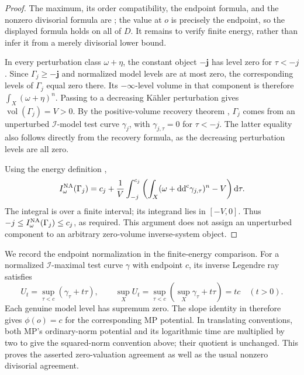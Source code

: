 \begin{proof}
The maximum, its order compatibility, the endpoint formula, and the
nonzero divisorial formula are
\cite[Definition~4.7 and Corollary~4.8]{Xia23}; the value at \(o\)
is precisely the endpoint, so the displayed formula holds on all of \(D\).
It remains to verify finite energy, rather than infer it from a merely
divisorial lower bound.

In every perturbation class \(\omega+\eta\), the constant object
\(\mathbf{-j}\) has level zero for \(\tau<-j\).
Since \(\Gamma_j\geq\mathbf{-j}\) and normalized model levels are at
most zero, the corresponding levels of \(\Gamma_j\) equal zero there.
Its \(-\infty\)-level volume in that component is therefore
\(\int_X(\omega+\eta)^n\). Passing to a decreasing K\"ahler perturbation
gives \(\operatorname{vol}(\Gamma_j)=V>0\).
By the positive-volume recovery theorem
\cite[Lemma~3.10]{Xia23}, \(\Gamma_j\) comes from an unperturbed
\(\mathcal I\)-model test curve \(\gamma_j\), with
\(\gamma_{j,\tau}=0\) for \(\tau<-j\).
The latter equality also follows directly from the recovery formula,
as the decreasing perturbation levels are all zero.

Using the energy definition \cite[formula~(43)]{DXZ23},
\[
 I^{\mathrm{NA}}_\omega(\Gamma_j)
  =c_j+\frac1V\int_{-j}^{c_j}
        \left(\int_X(\omega+\mathrm d\mathrm d^{\mathrm c}\gamma_{j,\tau})^n-V\right)\mathrm d\tau.
\]
The integral is over a finite interval; its integrand lies in \([-V,0]\).
Thus \(-j\leq I^{\mathrm{NA}}_\omega(\Gamma_j)\leq c_j\), as required.
This argument does not assign an unperturbed component to an arbitrary
zero-volume inverse-system object.
\end{proof}

We record the endpoint normalization in the finite-energy comparison.
For a normalized \(\mathcal I\)-maximal test curve \(\gamma\) with
endpoint \(c\), its inverse Legendre ray satisfies
\[
 U_t=\sup_{\tau<c}(\gamma_\tau+t\tau),\qquad
 \sup_X U_t=\sup_{\tau<c}(\sup_X\gamma_\tau+t\tau)=tc\quad(t>0).
\]
Each genuine model level has supremum zero. The slope identity in
\cite[Lemma~5.3.1]{MP24} therefore gives \(\phi(o)=c\) for the
corresponding MP potential. In translating conventions, both MP's
ordinary-norm potential and its logarithmic time are multiplied by two
to give the squared-norm convention above; their quotient is unchanged.
This proves the asserted zero-valuation agreement as well as the usual
nonzero divisorial agreement.

